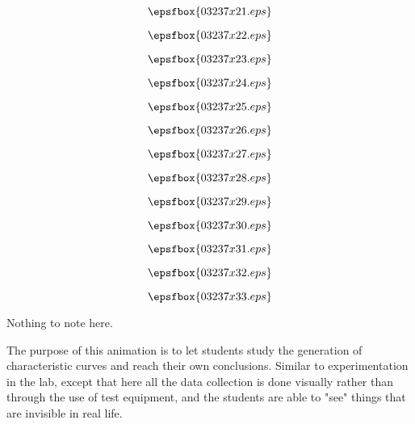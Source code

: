 \vfil \eject
$$\epsfbox{03237x21.eps}$$

\vfil \eject
$$\epsfbox{03237x22.eps}$$

\vfil \eject
$$\epsfbox{03237x23.eps}$$

\vfil \eject
$$\epsfbox{03237x24.eps}$$

\vfil \eject
$$\epsfbox{03237x25.eps}$$

\vfil \eject
$$\epsfbox{03237x26.eps}$$

\vfil \eject
$$\epsfbox{03237x27.eps}$$

\vfil \eject
$$\epsfbox{03237x28.eps}$$

\vfil \eject
$$\epsfbox{03237x29.eps}$$

\vfil \eject
$$\epsfbox{03237x30.eps}$$

\vfil \eject
$$\epsfbox{03237x31.eps}$$

\vfil \eject
$$\epsfbox{03237x32.eps}$$

\vfil \eject
$$\epsfbox{03237x33.eps}$$


\vfil \eject







Nothing to note here.







The purpose of this animation is to let students study the generation of characteristic curves and reach their own conclusions.  Similar to experimentation in the lab, except that here all the data collection is done visually rather than through the use of test equipment, and the students are able to "see" things that are invisible in real life.




